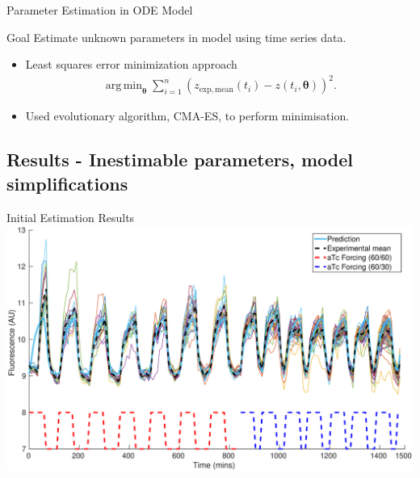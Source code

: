 \documentclass{beamer}
\DeclareMathOperator*{\argmin}{arg\,min}
\begin{document}
\begin{frame}{Parameter Estimation in ODE Model}
  \begin{block}{Goal}
 Estimate unknown parameters in model using time series data.
    \end{block}
    
      \begin{itemize}
    \item  Least squares error minimization approach
    \begin{align*}
\argmin_{\boldsymbol{\theta}} \sum_{i =1}^{n} (z_{\mathrm{exp, mean}}(t_{i}) - z(t_{i},\boldsymbol{\theta}))^2.
\end{align*}
\item Used evolutionary algorithm, CMA-ES, to perform minimisation.
    \end{itemize}
\end{frame}

\subsection{Results - Inestimable parameters, model simplifications}

\begin{frame}{Initial Estimation Results}
  \includegraphics[scale = 0.26, clip = true, trim = 50 0 0 0]{../Figures/13_9_bestPlot}
\end{frame}
\end{document}
